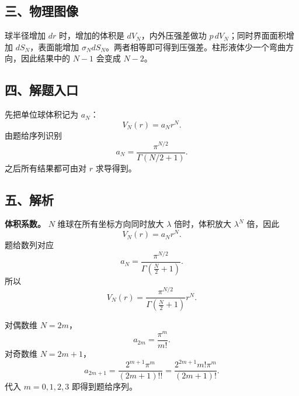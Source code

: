 \documentclass[12pt,a4paper,UTF8]{ctexart}
\begin{document}
\subsection{三、物理图像}\label{ux4e09ux7269ux7406ux56feux50cf-2}

球半径增加 \(dr\) 时，增加的体积是 \(dV_N\)，内外压强差做功
\(p\,dV_N\)；同时界面面积增加 \(dS_N\)，表面能增加
\(\sigma_NdS_N\)。两者相等即可得到压强差。柱形液体少一个弯曲方向，因此结果中的
\(N-1\) 会变成 \(N-2\)。

\subsection{四、解题入口}\label{ux56dbux89e3ux9898ux5165ux53e3-2}

先把单位球体积记为 \(a_N\)： \[
V_N(r)=a_Nr^N.
\] 由题给序列识别 \[
a_N=\frac{\pi^{N/2}}{\Gamma(N/2+1)}.
\] 之后所有结果都可由对 \(r\) 求导得到。

\subsection{五、解析}\label{ux4e94ux89e3ux6790-2}

\textbf{体积系数。} \(N\) 维球在所有坐标方向同时放大 \(\lambda\)
倍时，体积放大 \(\lambda^N\) 倍，因此 \[
V_N(r)=a_Nr^N. \tag{1}
\] 题给数列对应 \[
\boxed{
a_N=\frac{\pi^{N/2}}{\Gamma\!\left(\frac N2+1\right)}
}. \tag{2}
\] 所以 \[
\boxed{
V_N(r)
=\frac{\pi^{N/2}}{\Gamma\!\left(\frac N2+1\right)}r^N
}. \tag{3}
\]

对偶数维 \(N=2m\)， \[
a_{2m}=\frac{\pi^m}{m!}. \tag{4}
\] 对奇数维 \(N=2m+1\)， \[
a_{2m+1}
=\frac{2^{m+1}\pi^m}{(2m+1)!!}
=\frac{2^{2m+1}m!\pi^m}{(2m+1)!}. \tag{5}
\] 代入 \(m=0,1,2,3\) 即得到题给序列。
\end{document}

